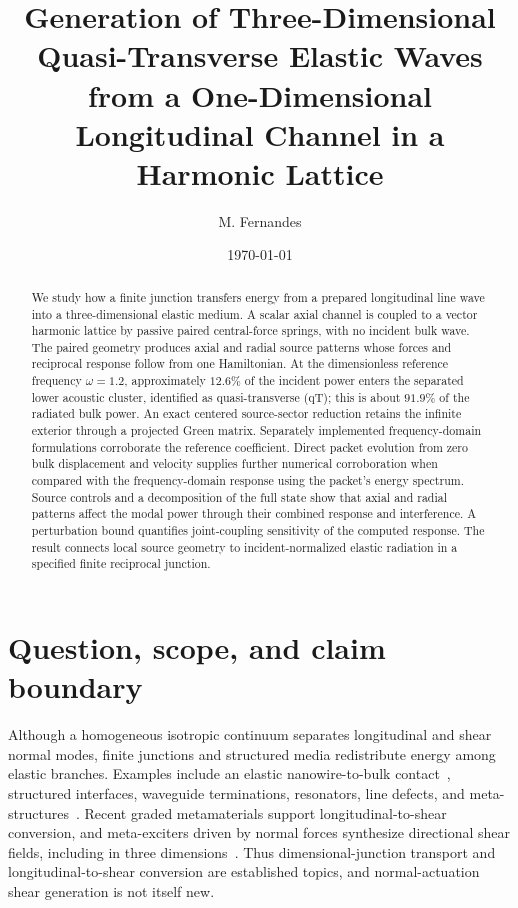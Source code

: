 \documentclass[10pt,aps,pre,reprint,floatfix,notitlepage,nofootinbib]{revtex4-2}
\begin{document}
\title{Generation of Three-Dimensional Quasi-Transverse Elastic Waves from a One-Dimensional Longitudinal Channel in a Harmonic Lattice}
\author{M. Fernandes}
\date{\today}

\begin{abstract}
We study how a finite junction transfers energy from a prepared longitudinal line wave into a three-dimensional elastic medium. A scalar axial channel is coupled to a vector harmonic lattice by passive paired central-force springs, with no incident bulk wave. The paired geometry produces axial and radial source patterns whose forces and reciprocal response follow from one Hamiltonian. At the dimensionless reference frequency $\omega=1.2$, approximately $12.6\%$ of the incident power enters the separated lower acoustic cluster, identified as quasi-transverse (qT); this is about $91.9\%$ of the radiated bulk power. An exact centered source-sector reduction retains the infinite exterior through a projected Green matrix. Separately implemented frequency-domain formulations corroborate the reference coefficient. Direct packet evolution from zero bulk displacement and velocity supplies further numerical corroboration when compared with the frequency-domain response using the packet's energy spectrum. Source controls and a decomposition of the full state show that axial and radial patterns affect the modal power through their combined response and interference. A perturbation bound quantifies joint-coupling sensitivity of the computed response. The result connects local source geometry to incident-normalized elastic radiation in a specified finite reciprocal junction.
\end{abstract}
\maketitle

\section{Question, scope, and claim boundary}
\label{sec:scope}

Although a homogeneous isotropic continuum separates longitudinal and shear normal modes, finite junctions and structured media redistribute energy among elastic branches. Examples include an elastic nanowire-to-bulk contact~\cite{ChangGeller2005}, structured interfaces, waveguide terminations, resonators, line defects, and meta-structures~\cite{ZulKarnain2020,Chaplain2020,NievesSharma2024,Clark2025,DalPoggetto2025}. Recent graded metamaterials support longitudinal-to-shear conversion, and meta-exciters driven by normal forces synthesize directional shear fields, including in three dimensions~\cite{Boddapati2026Graded,Liang2026MetaExcitation,Lu2026ThreeDimensional}. Thus dimensional-junction transport and longitudinal-to-shear conversion are established topics, and normal-actuation shear generation is not itself new.
\end{document}
